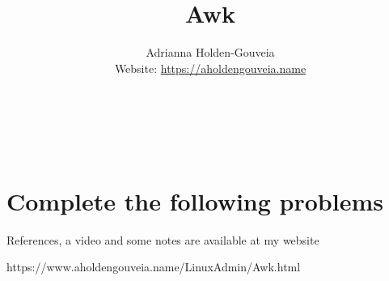 \documentclass[12pt]{article}
\title{Awk}
\author{
        Adrianna Holden-Gouveia \\
        Website: \url{https://aholdengouveia.name}\\ 
        \date{\vspace{-5ex}}
        \faLinkedin{: aholdengouveia} \\
        \faGithub {: aholdengouveia} \\
        \faTwitter {: aholdengouveia} \\
        }
\begin{document}
    

\maketitle

\section*{Complete the following problems}

References, a video and some notes are available at my website

https://www.aholdengouveia.name/LinuxAdmin/Awk.html
\end{document}
